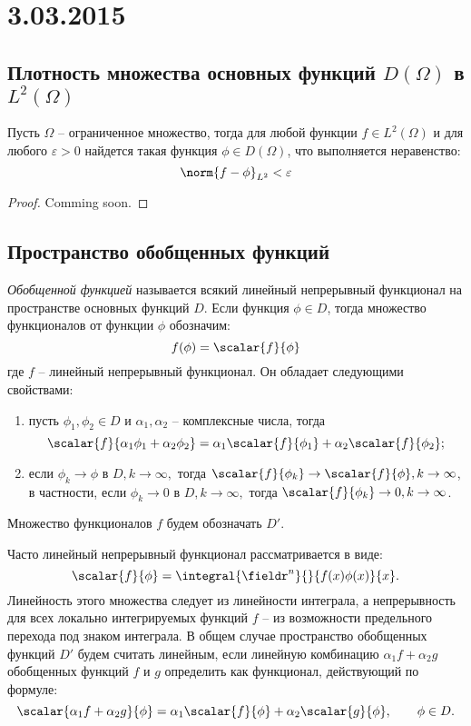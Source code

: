 \section{3.03.2015}
\subsection{Плотность множества основных функций $D(\Omega)$ в $L^2(\Omega)$}
\begin{lemma}
Пусть $\Omega$ -- ограниченное множество, тогда для любой функции $f \in L^2(\Omega)$ и для любого $\varepsilon > 0$ найдется такая функция $\phi \in D(\Omega)$, что выполняется неравенство:
$$
\norm{f - \phi}_{L^2} < \varepsilon
$$
\end{lemma}
\begin{proof}
   Comming soon.
\end{proof}

\subsection{Пространство обобщенных функций}
\emph{Обобщенной функцией} называется всякий линейный непрерывный функционал на пространстве основных функций $D$. Если функция $\phi \in D$, тогда множество функционалов от функции $\phi$ обозначим: 
$$
f(\phi) = \scalar{f}{\phi}
$$ 
где $f$ -- линейный непрерывный функционал. Он  обладает следующими свойствами:
\begin{enumerate}
 \item пусть $\phi_1, \phi_2 \in D$ и $\alpha_1, \alpha_2$ -- комплексные числа, тогда 
 $$
 \scalar{f}{\alpha_1 \phi_1 + \alpha_2 \phi_2} = \alpha_1 \scalar{f}{\phi_1} + \alpha_2 \scalar{f}{\phi_2};
 $$
 \item если $\phi_k \to \phi$  в  $D, k \to \infty,$ тогда $\scalar{f}{\phi_k} \to \scalar{f}{\phi}, k \to \infty$, в частности, если $\phi_k \to 0$  в  $D, k \to \infty,$ тогда $\scalar{f}{\phi_k} \to 0, k \to \infty$.
\end{enumerate}
Множество функционалов $f$ будем обозначать $D'.$

Часто линейный непрерывный функционал рассматривается в виде:
$$
\scalar{f}{\phi} = \integral{\fieldr^n}{}{f(x)\phi(x)}{x}.
$$
Линейность этого множества следует из линейности интеграла, а непрерывность для всех локально интегрируемых функций $f$ -- из возможности предельного перехода под знаком интеграла.
В общем случае пространство обобщенных функций $D'$ будем считать линейным, если линейную комбинацию $\alpha_1 f + \alpha_2 g$ обобщенных функций $f$ и $g$ определить как функционал, действующий по формуле:
$$
\scalar{\alpha_1 f + \alpha_2 g}{\phi} = \alpha_1 \scalar{f}{\phi} + \alpha_2 \scalar{g}{\phi}, \qquad \phi \in D.
$$

